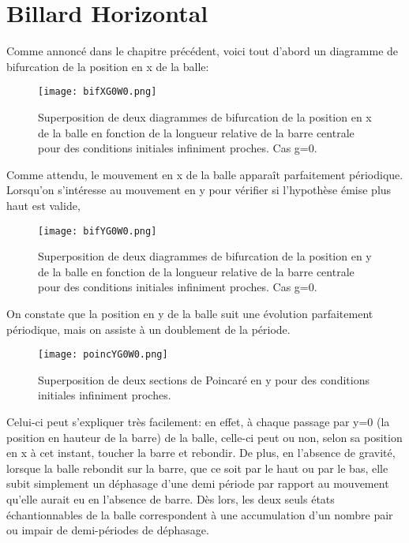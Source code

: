 \documentclass[a4paper]{report}
\begin{document}
\section{Billard Horizontal}
\label{sec:xRegHor}
Comme annoncé dans le chapitre précédent, voici tout d'abord un diagramme de bifurcation de la position en x de la balle:
\begin{figure}[h!]
   \texttt{[image: bifXG0W0.png]}
      \caption[Diagramme de bifurcation en x: g=0 ]{Superposition de deux diagrammes de bifurcation de la position en x de la balle en fonction de la longueur relative de la barre centrale pour des conditions initiales infiniment proches. Cas g=0.}
\end{figure}

Comme attendu, le mouvement en x de la balle apparaît parfaitement périodique. Lorsqu'on s'intéresse au mouvement en y pour vérifier si l'hypothèse émise plus haut est valide,
\begin{figure}[h!]
   \texttt{[image: bifYG0W0.png]}
      \caption[Diagramme de bifurcation en y: g=0 ]{Superposition de deux diagrammes de bifurcation de la position en y de la balle en fonction de la longueur relative de la barre centrale pour des conditions initiales infiniment proches. Cas g=0.}
\end{figure}
On constate que la position en y de la balle suit une évolution parfaitement périodique, mais on assiste à un doublement de la période.
\begin{figure}[H]
   \texttt{[image: poincYG0W0.png]}
      \caption[Section de Poincaré en y: g=0 ]{Superposition de deux sections de Poincaré en y pour des conditions initiales infiniment proches.}
\end{figure}

Celui-ci peut s'expliquer très facilement: en effet, à chaque passage par y=0 (la position en hauteur de la barre) de la balle, celle-ci peut ou non, selon sa position en x à cet instant, toucher la barre et rebondir. De plus, en l'absence de gravité, lorsque la balle rebondit sur la barre, que ce soit par le haut ou par le bas, elle subit simplement un déphasage d'une demi période par rapport au mouvement qu'elle aurait eu en l'absence de barre. Dès lors, les deux seuls états échantionnables de la balle correspondent à une accumulation d'un nombre pair ou impair de demi-périodes de déphasage.
\end{document}
